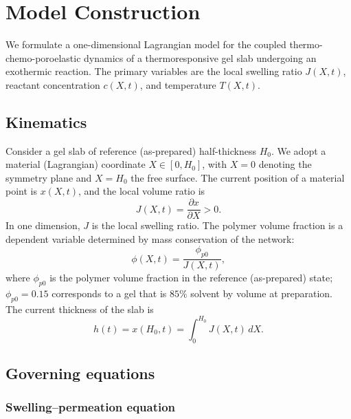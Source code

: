 \documentclass[aps,pre,reprint,superscriptaddress,longbibliography,floatfix]{revtex4-2}
\newcommand{\pp}{\phi_{p0}}
\begin{document}
\appendix

\section{Model Construction}
\label{app:model}

We formulate a one-dimensional Lagrangian model for the coupled thermo-chemo-poroelastic dynamics of a thermoresponsive gel slab undergoing an exothermic reaction. The primary variables are the local swelling ratio $J(X,t)$, reactant concentration $c(X,t)$, and temperature $T(X,t)$.

\subsection{Kinematics}

Consider a gel slab of reference (as-prepared) half-thickness $H_0$. We adopt a material (Lagrangian) coordinate $X\in[0,H_0]$, with $X=0$ denoting the symmetry plane and $X=H_0$ the free surface. The current position of a material point is $x(X,t)$, and the local volume ratio is
\begin{equation}
  J(X,t) = \frac{\partial x}{\partial X} > 0.
  \label{eq:J_def}
\end{equation}
In one dimension, $J$ is the local swelling ratio. The polymer volume fraction is a dependent variable determined by mass conservation of the network:
\begin{equation}
  \phi(X,t) = \frac{\pp}{J(X,t)},
  \label{eq:phi_J}
\end{equation}
where $\pp$ is the polymer volume fraction in the reference (as-prepared) state; $\pp=0.15$ corresponds to a gel that is $85\%$ solvent by volume at preparation. The current thickness of the slab is
\begin{equation}
  h(t) = x(H_0,t) = \int_0^{H_0} J(X,t)\,dX.
  \label{eq:thickness}
\end{equation}

\subsection{Governing equations}

\subsubsection{Swelling--permeation equation}
\end{document}
